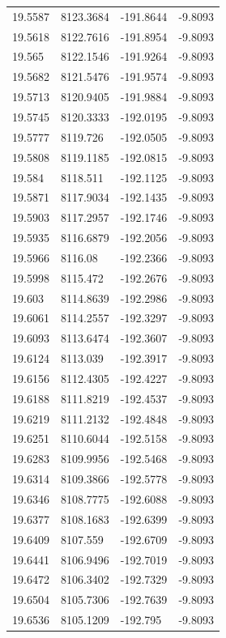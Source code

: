 \begin{table}[H]
\begin{tabular}{llll}
19.5587 & 8123.3684 & -191.8644 & -9.8093 \\
19.5618 & 8122.7616 & -191.8954 & -9.8093 \\
19.565 & 8122.1546 & -191.9264 & -9.8093 \\
19.5682 & 8121.5476 & -191.9574 & -9.8093 \\
19.5713 & 8120.9405 & -191.9884 & -9.8093 \\
19.5745 & 8120.3333 & -192.0195 & -9.8093 \\
19.5777 & 8119.726 & -192.0505 & -9.8093 \\
19.5808 & 8119.1185 & -192.0815 & -9.8093 \\
19.584 & 8118.511 & -192.1125 & -9.8093 \\
19.5871 & 8117.9034 & -192.1435 & -9.8093 \\
19.5903 & 8117.2957 & -192.1746 & -9.8093 \\
19.5935 & 8116.6879 & -192.2056 & -9.8093 \\
19.5966 & 8116.08 & -192.2366 & -9.8093 \\
19.5998 & 8115.472 & -192.2676 & -9.8093 \\
19.603 & 8114.8639 & -192.2986 & -9.8093 \\
19.6061 & 8114.2557 & -192.3297 & -9.8093 \\
19.6093 & 8113.6474 & -192.3607 & -9.8093 \\
19.6124 & 8113.039 & -192.3917 & -9.8093 \\
19.6156 & 8112.4305 & -192.4227 & -9.8093 \\
19.6188 & 8111.8219 & -192.4537 & -9.8093 \\
19.6219 & 8111.2132 & -192.4848 & -9.8093 \\
19.6251 & 8110.6044 & -192.5158 & -9.8093 \\
19.6283 & 8109.9956 & -192.5468 & -9.8093 \\
19.6314 & 8109.3866 & -192.5778 & -9.8093 \\
19.6346 & 8108.7775 & -192.6088 & -9.8093 \\
19.6377 & 8108.1683 & -192.6399 & -9.8093 \\
19.6409 & 8107.559 & -192.6709 & -9.8093 \\
19.6441 & 8106.9496 & -192.7019 & -9.8093 \\
19.6472 & 8106.3402 & -192.7329 & -9.8093 \\
19.6504 & 8105.7306 & -192.7639 & -9.8093 \\
19.6536 & 8105.1209 & -192.795 & -9.8093 \\

\end{tabular}
\end{table}
